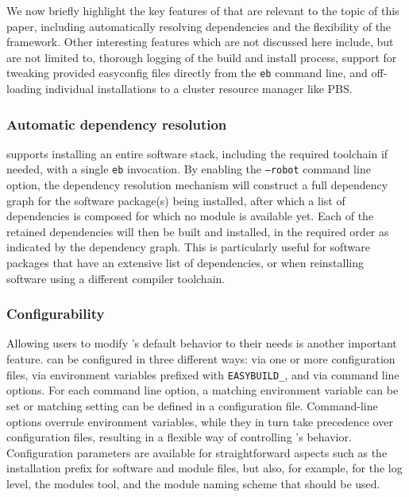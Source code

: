 We now briefly highlight the key features of \easybuild{} that are relevant
to the topic of this paper, including automatically resolving dependencies and
the flexibility of the \easybuild{} framework. Other interesting features which are
not discussed here include, but are not limited to, thorough logging of the build
and install process, support for tweaking provided easyconfig files directly from
the \texttt{\small eb} command line, and off-loading individual installations to
a cluster resource manager like PBS.

\subsubsection{Automatic dependency resolution}
\label{sec:eb_dependency_resolution}

\easybuild{} supports installing an entire software stack, including the required
toolchain if needed, with a single \texttt{\small eb} invocation. By enabling the
\texttt{\small --robot} command line option, the dependency resolution mechanism will
construct a full dependency graph for the software package(s) being installed, after
which a list of dependencies is composed for which no module is available yet. Each of
the retained dependencies will then be built and installed, in the required order as
indicated by the dependency graph. This is particularly useful for software
packages that have an extensive list of dependencies, or when reinstalling software
using a different compiler toolchain.

\subsubsection{Configurability}
\label{sec:eb_configurability}

Allowing users to modify \easybuild{}'s default behavior to their needs is another
important feature. \easybuild{} can be configured in three different ways: via one or
more configuration files, via environment variables prefixed with
\texttt{\small EASYBUILD\_}, and via command line options. For each command line
option, a matching environment variable can be set or matching setting can be
defined in a configuration file. Command-line options overrule environment
variables, while they in turn take precedence over configuration files, resulting in a
flexible way of controlling \easybuild{}'s behavior.
Configuration parameters are available for straightforward aspects such as the
installation prefix for software and module files, but also, for example, for the
log level, the modules tool, and the module naming scheme that should be used.

